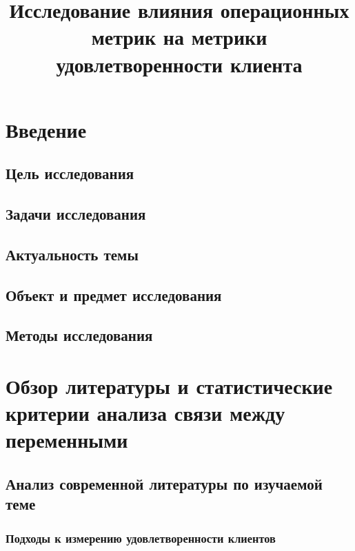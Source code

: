 \documentclass[12pt]{article}
\title{\textbf{Исследование влияния операционных метрик на метрики удовлетворенности клиента}}
\author{}
\date{}
\begin{document}
\maketitle
\thispagestyle{empty}
\newpage

\tableofcontents
\thispagestyle{empty}
\newpage

\section{Введение}

\subsection*{Цель исследования}
\vspace{0.5em}

\subsection*{Задачи исследования}
\vspace{0.5em}

\subsection*{Актуальность темы}
\vspace{0.5em}

\subsection*{Объект и предмет исследования}
\vspace{0.5em}

\subsection*{Методы исследования}
\vspace{0.5em}

\newpage
\section{Обзор литературы и статистические критерии анализа связи между переменными}

\subsection{Анализ современной литературы по изучаемой теме}

\subsubsection{Подходы к измерению удовлетворенности клиентов}
\vspace{0.5em}
\end{document}

